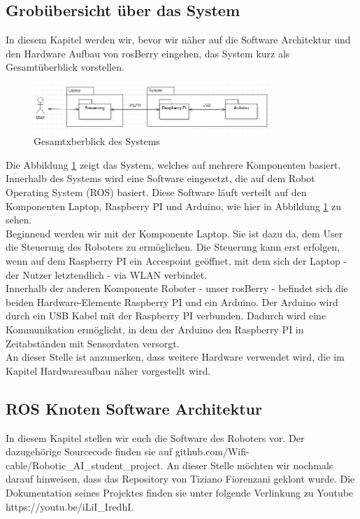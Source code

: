 \documentclass[conference]{IEEEtran}
\begin{document}
	\subsection{Grobübersicht über das System}
	In diesem Kapitel werden wir, bevor wir näher auf die Software Architektur und den Hardware Aufbau von rosBerry eingehen, das System kurz als Gesamtüberblick vorstellen.
	
	\begin{figure}[!ht]
		\centering
		\includegraphics[width=9cm]{img/Gesamtsystem.PNG}
		\caption{Gesamtxberblick des Systems}
		\label{Gesamt zusammenhang}
	\end{figure}
	Die Abbildung \ref{Gesamt zusammenhang} zeigt das System, welches auf mehrere Komponenten basiert. Innerhalb des Systems wird eine Software eingesetzt, die auf dem Robot Operating System (ROS) basiert. Diese Software läuft verteilt auf den Komponenten Laptop, Raspberry PI und Arduino, wie hier in Abbildung \ref{Gesamt zusammenhang} zu sehen. \\
	
	Beginnend werden wir mit der Komponente Laptop. Sie ist dazu da, dem User die Steuerung des Roboters zu ermöglichen. Die Steuerung kann erst erfolgen, wenn auf dem Raspberry PI ein Accespoint geöffnet, mit dem sich der Laptop - der Nutzer letztendlich - via WLAN verbindet.\\
	Innerhalb der anderen Komponente Roboter - unser rosBerry - befindet sich die beiden Hardware-Elemente Raspberry PI und ein Arduino. Der Arduino wird durch ein USB Kabel mit der Raspberry PI verbunden. Dadurch wird eine Kommunikation ermöglicht, in dem der Arduino den Raspberry PI in Zeitabständen mit Sensordaten versorgt.\\
	An dieser Stelle ist anzumerken, dass weitere Hardware verwendet wird, die im Kapitel Hardwareaufbau näher vorgestellt wird.
	
	\subsection{ROS Knoten Software Architektur}%
	In diesem Kapitel stellen wir euch die Software des Roboters vor. Der dazugehörige Sourcecode finden sie auf github.com/Wifi-cable/Robotic\_AI\_student\_project. An dieser Stelle möchten wir nochmals darauf hinweisen, dass das Repository von Tiziano Fiorenzani geklont wurde. Die Dokumentation seines Projektes finden sie unter folgende Verlinkung zu Youtube https://youtu.be/iLiI\_IredhI.
	
\end{document}
